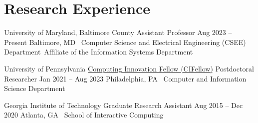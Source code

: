 
\section*{{} Research Experience}

\vspace{-6pt}
\begin{cventries}


  \cventry
    {University of Maryland, Baltimore County} %
    {Assistant Professor} %
    {Aug 2023 – Present} %
    {Baltimore, MD} %
    {
    ~Computer Science and Electrical Engineering (CSEE) Department\newline~Affiliate of the Information Systems Department
    }

  \cventry
    {University of Pennsylvania} %
    {\href{https://cifellows2020.org/}{Computing Innovation Fellow (CIFellow)} Postdoctoral Researcher} %
    {Jan 2021 – Aug 2023} %
    {Philadelphia, PA} %
    {~Computer and Information Science Department
    }
    
  \cventry
    {Georgia Institute of Technology} %
    {Graduate Research Assistant} %
    {Aug 2015 – Dec 2020} %
    {Atlanta, GA} %
    {~School of Interactive Computing
    }


\end{cventries}
